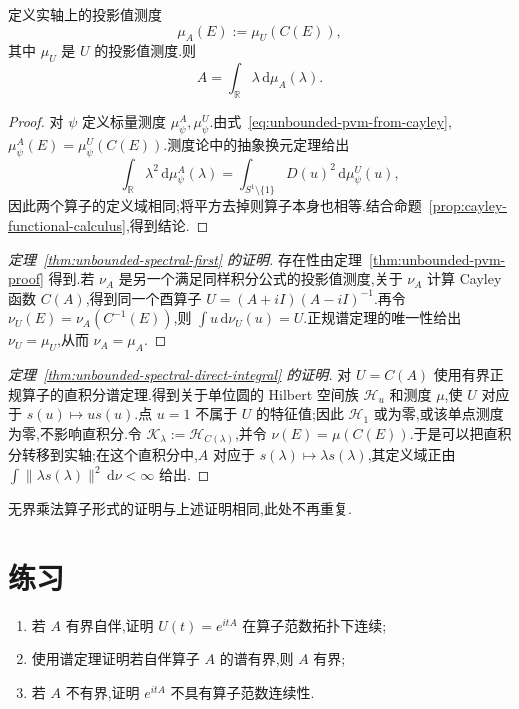 \begin{theorem}[无界自伴算子的投影值谱定理]\label{thm:unbounded-pvm-proof}
定义实轴上的投影值测度
\[
\mu_{A}(E):=\mu_{U}(C(E)),
\label{eq:unbounded-pvm-from-cayley}
\]
其中 \(\mu_{U}\) 是 \(U\) 的投影值测度.则
\[
A=\int_{\mathbb{R}}\lambda\,\mathrm{d}\mu_{A}(\lambda).
\]
\end{theorem}

\begin{proof}
对 \(\psi\) 定义标量测度 \(\mu_{\psi}^{A},\mu_{\psi}^{U}\).由式~\eqref{eq:unbounded-pvm-from-cayley},\(\mu_{\psi}^{A}(E)=\mu_{\psi}^{U}(C(E))\).测度论中的抽象换元定理给出
\[
\int_{\mathbb{R}}\lambda^{2}\,\mathrm{d}\mu_{\psi}^{A}(\lambda)
=\int_{S^{1}\setminus\{1\}}D(u)^{2}\,\mathrm{d}\mu_{\psi}^{U}(u),
\]
因此两个算子的定义域相同;将平方去掉则算子本身也相等.结合命题~\ref{prop:cayley-functional-calculus},得到结论.
\end{proof}

\begin{proof}[定理~\ref{thm:unbounded-spectral-first} 的证明]
存在性由定理~\ref{thm:unbounded-pvm-proof} 得到.若 \(\nu_{A}\) 是另一个满足同样积分公式的投影值测度,关于 \(\nu_{A}\) 计算 Cayley 函数 \(C(A)\),得到同一个酉算子 \(U=(A+iI)(A-iI)^{-1}\).再令 \(\nu_{U}(E)=\nu_{A}(C^{-1}(E))\),则 \(\int u\,\mathrm{d}\nu_{U}(u)=U\).正规谱定理的唯一性给出 \(\nu_{U}=\mu_{U}\),从而 \(\nu_{A}=\mu_{A}\).
\end{proof}

\begin{proof}[定理~\ref{thm:unbounded-spectral-direct-integral} 的证明]
对 \(U=C(A)\) 使用有界正规算子的直积分谱定理.得到关于单位圆的 Hilbert 空间族 \(\mathcal{H}_{u}\) 和测度 \(\mu\),使 \(U\) 对应于 \(s(u)\mapsto us(u)\).点 \(u=1\) 不属于 \(U\) 的特征值;因此 \(\mathcal{H}_{1}\) 或为零,或该单点测度为零,不影响直积分.令 \(\mathcal{K}_{\lambda}:=\mathcal{H}_{C(\lambda)}\),并令 \(\nu(E)=\mu(C(E))\).于是可以把直积分转移到实轴;在这个直积分中,\(A\) 对应于 \(s(\lambda)\mapsto\lambda s(\lambda)\),其定义域正由 \(\int\|\lambda s(\lambda)\|^{2}\,\mathrm{d}\nu<\infty\) 给出.
\end{proof}

无界乘法算子形式的证明与上述证明相同,此处不再重复.

\section{练习}
\label{sec:chapter10-exercises}

\begin{exercise}[一参数群的范数连续性]\label{ex:unitary-group-norm-continuity}
\begin{enumerate}[label=(\alph*)]
\item 若 \(A\) 有界自伴,证明 \(U(t)=e^{itA}\) 在算子范数拓扑下连续;
\item 使用谱定理证明若自伴算子 \(A\) 的谱有界,则 \(A\) 有界;
\item 若 \(A\) 不有界,证明 \(e^{itA}\) 不具有算子范数连续性.
\end{enumerate}
\end{exercise}

